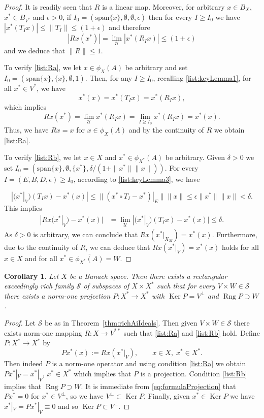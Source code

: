 \documentclass[11pt]{amsart}
\newtheorem{cor}[thm]{Corollary}
\theoremstyle{definition}
\theoremstyle{remark}
\newcommand{\SSS}{\mathcal S}
\def \rng {\operatorname{Rng}}
\def \ker {\operatorname{Ker}}
\begin{document}
\begin{proof}
It is readily seen that $R$ is a linear map. Moreover, for arbitrary $x \in B_X$, $x^*\in B_{V^*}$ and $\epsilon>0$, if $I_0=(\mathrm{span}\{x\},\emptyset,\emptyset,\epsilon)$ then for every $I\geq I_0$ we have $|x^*(T_Ix)|\leq \|T_I\|\leq (1+\epsilon)$ and therefore
\[|Rx(x^*)|=\lim_{\mathcal{U}}|x^*(R_Ix)|\leq (1+\epsilon)\]
and we deduce that $\|R\|\leq 1$.

To verify \ref{list:Ra}, we let $x \in \phi_X(A)$ be arbitrary and set $I_0 = (\mathrm{span}\{x\}, \{x\}, \emptyset, 1)$. Then, for any $I \geq I_0$, recalling \ref{list:keyLemma1}, for all $x^* \in V^*$, we have
\[x^*(x)=x^*(T_Ix)=x^*(R_Ix),\]
which implies
\[Rx(x^*) = \lim_{\mathcal{U}} x^*(R_Ix)=\lim_{I\geq I_0} x^*(R_Ix)=x^*(x).\]
Thus, we have $Rx=x$ for $x\in \phi_X(A)$ and by the continuity of $R$ we obtain \ref{list:Ra}.

To verify \ref{list:Rb}, we let $x\in X$ and $x^*\in \phi_{X^*}(A)$ be arbitrary. Given $\delta>0$ we set $I_0=(\mathrm{span}\{x\},\emptyset, \{x^*\}, \delta/(1+\|x^*\|\|x\|))$. For every $I=(E,B,D,\epsilon)\geq I_0$, according to \ref{list:keyLemma3}, we have

\[|(x^*|_{V})(T_Ix)-x^*(x)| \leq \|(x^*\circ T_I-x^*)|_E\| \|x\|\leq \epsilon\|x^*\|\|x\|<\delta.\] 
This implies
\begin{align*}
|Rx(x^*|_{V})- x^*(x)|&= \lim_{\mathcal{U}}|(x^*|_{V})(T_Ix)-x^*(x)|\leq \delta.
\end{align*}
As $\delta>0$ is arbitrary, we can conclude that $Rx(x^*|_{X_M})=x^*(x)$. Furthermore, due to the continuity of $R$, we can deduce that $Rx(x^*|_{V})=x^*(x)$ holds for all $x\in X$ and for all $x^{*}\in \overline{\phi_{X^*}(A)} = W$.
\end{proof}

\begin{cor}\label{cor:projectionAiIdeal}Let $X$ be a Banach space. Then there exists a rectangular exceedingly rich family $\SSS$ of subspaces of $X\times X^*$ such that for every $V\times W\in \SSS$ there exists a norm-one projection $P:X^*\to X^*$ with $\ker P = V^\perp$ and $\rng P\supset W$.
\end{cor}
\begin{proof}Let $\SSS$ be as in Theorem~\ref{thm:richAiIdeals}. Then given $V\times W\in \SSS$ there exists norm-one mapping $R:X\to V^{**}$ such that \ref{list:Ra} and \ref{list:Rb} hold. Define $P:X^*\to X^*$ by 
\begin{equation}\label{eq:formulaProjection}
Px^*(x):=Rx(x^*|_{V}),\qquad x\in X,\; x^*\in X^*.
\end{equation}
Then indeed $P$ is a norm-one operator and using condition \ref{list:Ra} we obtain $Px^*|_V = x^*|_V$, $x^*\in X^*$ which implies that $P$ is a projection. Condition \ref{list:Rb} implies that $\rng P\supset W$. It is immediate from \eqref{eq:formulaProjection} that $Px^* = 0$ for $x^*\in V^\perp$, so we have $V^\perp \subset \ker P$. Finally, given $x^*\in \ker P$ we have $x^*|_V = Px^*|_V \equiv 0$ and so $\ker P\subset V^\perp$.
\end{proof}
\end{document}
